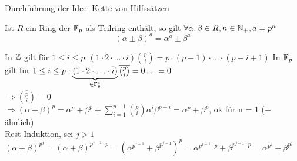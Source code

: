 \documentclass[a4paper,twoside,DIV15,BCOR12mm]{scrbook}
\begin{document}
Durchführung der Idee: Kette von Hilfssätzen
\begin{hilfssatz}[1]
Ist $R$ ein Ring der $\mathbb{F}_p$ als Teilring enthält, so gilt $\forall \alpha,\beta \in R,n\in \mathbb{N}_+,a=p^n$
$$(\alpha \pm \beta)^a = \alpha^a \pm \beta^a$$
\end{hilfssatz}
\begin{beweis}
In $\mathbb{Z}$ gilt für $1 \leq i \leq p: (1 \cdot 2 \cdot \dotsc \cdot i){p \choose i} = p \cdot (p-1) \cdot \dotsc \cdot (p-i+1)$
In $\mathbb{F}_p$ gilt für $1 \leq i \leq p: \underbrace{(\overline 1 \cdot \overline 2 \cdot \dotsc \cdot \overline i)}_{\in \mathbb{F}_p^x}\overline{{p \choose i}} = \overline 0 \dotsc = \overline 0$ \\
$\Rightarrow \overline{{p \choose i}} = \overline 0$\\
$\Rightarrow (\alpha + \beta)^p = \alpha^p + \beta^p + \sum_{i=1}^{p-1}{p \choose i} \alpha^i\beta^{p-i} = \alpha^p + \beta^p$, ok für n = 1 ($-$ ähnlich)\\
Rest Induktion, sei $j > 1$\\
$(\alpha + \beta)^{p^j} = (\alpha + \beta)^{p^{j-1} \cdot p} = (\alpha^{p^{j-1}} + \beta^{p^{j-1}})^p = \alpha^{p^{j-1} \cdot p} + \beta^{p^{j-1} \cdot p} = \alpha^{p^j} + \beta^{p^j}$
\end{beweis}
\end{document}
